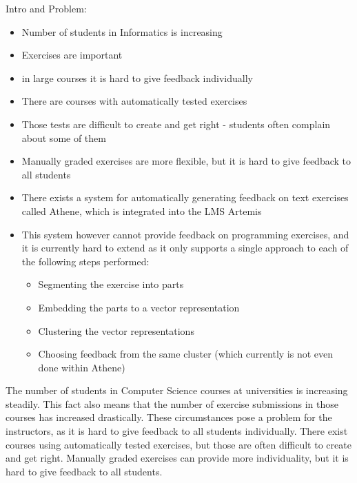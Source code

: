 Intro and Problem:
\begin{itemize}
        \item Number of students in Informatics is increasing
        \item Exercises are important
        \item in large courses it is hard to give feedback individually
        \item There are courses with automatically tested exercises
        \item Those tests are difficult to create and get right - students often complain about some of them
        \item Manually graded exercises are more flexible, but it is hard to give feedback to all students
        \item There exists a system for automatically generating feedback on text exercises called Athene, which is integrated into the LMS Artemis
        \item This system however cannot provide feedback on programming exercises, and it is currently hard to extend as it only supports a single approach to each of the following steps performed:
        \begin{itemize}
                \item Segmenting the exercise into parts
                \item Embedding the parts to a vector representation
                \item Clustering the vector representations
                \item Choosing feedback from the same cluster (which currently is not even done within Athene)
        \end{itemize}
\end{itemize}
The number of students in Computer Science courses at universities is increasing steadily. This fact also means that the number of exercise submissions in those courses has increased drastically.
These circumstances pose a problem for the instructors, as it is hard to give feedback to all students individually. There exist courses using automatically tested exercises, but those are often difficult to create and get right. Manually graded exercises can provide more individuality, but it is hard to give feedback to all students.

